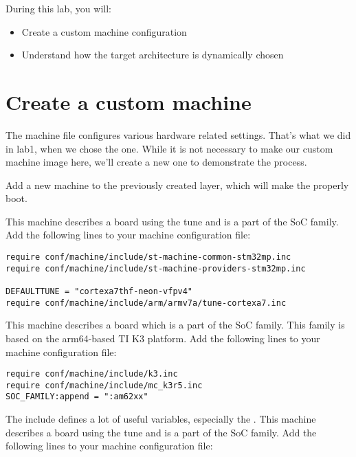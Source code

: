 
During this lab, you will:
\begin{itemize}
  \item Create a custom machine configuration
  \item Understand how the target architecture is dynamically chosen
\end{itemize}

\section{Create a custom machine}

The machine file configures various hardware related settings. That's
what we did in lab1, when we chose the 
{} {} one.
While it is not necessary to make our custom machine image here, we'll create a
new one to demonstrate the process.

Add a new  machine to the previously created layer, which
will make the
properly boot.

\if{}
This machine describes a board using the 
tune and is a part of the  SoC family. Add the following
lines to your machine configuration file:

\begin{verbatim}
require conf/machine/include/st-machine-common-stm32mp.inc
require conf/machine/include/st-machine-providers-stm32mp.inc

DEFAULTTUNE = "cortexa7thf-neon-vfpv4"
require conf/machine/include/arm/armv7a/tune-cortexa7.inc
\end{verbatim}
\else
  \if{}
This machine describes a board which is a part of the  SoC family.
This family is based on the arm64-based TI K3 platform.
Add the following lines to your machine configuration file:

\begin{verbatim}
require conf/machine/include/k3.inc
require conf/machine/include/mc_k3r5.inc
SOC_FAMILY:append = ":am62xx"
\end{verbatim}

The  include defines a lot of useful variables, especially
the .
  \else
This machine describes a board using the  tune
and is a part of the  SoC family. Add the following lines
to your machine configuration file:

